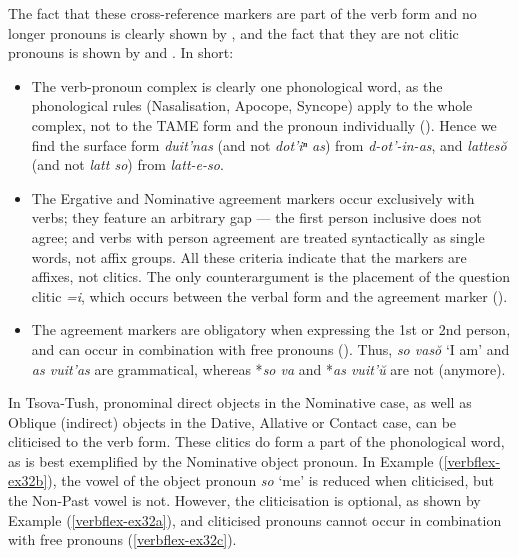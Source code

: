 The fact that these cross-reference markers are part of the verb form and no longer pronouns is clearly shown by \textcite{harris09}, and the fact that they are not clitic pronouns is shown by \textcite{harris11} and \textcite{kojima19}. In short:
\begin{itemize}
	\item The verb-pronoun complex is clearly one phonological word, as the phonological rules (Nasalisation, Apocope, Syncope) apply to the whole complex, not to the TAME form and the pronoun individually (\cite[281--284]{harris09}). Hence we find the surface form \textit{duit'nas} (and not \textit{dot'iⁿ as}) from \textit{d-ot'-in-as}, and \textit{lattes\u{o}} (and not \textit{latt so}) from \textit{latt-e-so}.
	
	\item The Ergative and Nominative agreement markers occur exclusively with verbs; they feature an arbitrary gap --- the first person inclusive does not agree; and verbs with person agreement are treated syntactically as single words, not affix groups. All these criteria indicate that the markers are affixes, not clitics. The only counterargument is the placement of the question clitic \textit{=i}, which occurs between the verbal form and the agreement marker (\cite[141--144]{harris11}).

	\item The agreement markers are obligatory when expressing the 1st or 2nd person, and can occur in combination with free pronouns (\cite[285]{kojima19}). Thus, \textit{so vas\u{o}} `I am' and \textit{as vuit'as} are grammatical, whereas *\textit{so va} and *\textit{as vuit'\u{u}} are not (anymore).
\end{itemize}

In Tsova-Tush, pronominal direct objects in the Nominative case, as well as Oblique (indirect) objects in the Dative, Allative or Contact case, can be cliticised to the verb form. These clitics do form a part of the phonological word, as is best exemplified by the Nominative object pronoun. In Example (\ref{verbflex-ex32b}), the vowel of the object pronoun \textit{so} `me' is reduced when cliticised, but the Non-Past vowel is not. However, the cliticisation is optional, as shown by Example (\ref{verbflex-ex32a}), and cliticised pronouns cannot occur in combination with free pronouns (\ref{verbflex-ex32c}).


